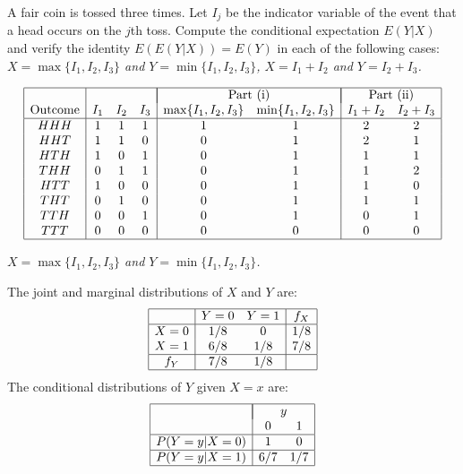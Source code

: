 \begin{exercise}
\begin{questions}
\question
A fair coin is tossed three times. Let $I_j$ be the indicator variable of the event that a head occurs on the $j$th toss. Compute the conditional expectation $E(Y|X)$ and verify the identity $E(E(Y|X)) = E(Y)$ in each of the following cases:
\ben
\it $X =\max\{I_1, I_2, I_3\}$ and $Y = \min\{I_1, I_2, I_3\}$,
\it $X = I_1 + I_2$ and $Y = I_2 + I_3$.
\een

\begin{answer}
\[
\begin{array}{|c|ccc|cc|cc|}\hline
 & & & & \multicolumn{2}{|c|}{\text{Part (i)}} & \multicolumn{2}{|c|}{\text{Part (ii)}} \\
\text{Outcome}	& I_1 & I_2 & I_3 & \max\{I_1,I_2,I_3\} & \min\{I_1,I_2,I_3\} & I_1+I_2 & I_2+I_3 \\ \hline
HHH	& 1 & 1 & 1 	& 1 & 1 	& 2 & 2 \\
HHT	& 1 & 1 & 0 	& 0 & 1 	& 2 & 1 \\
HTH	& 1 & 0 & 1 	& 0 & 1 	& 1 & 1 \\
THH	& 0 & 1 & 1 	& 0 & 1 	& 1 & 2 \\
HTT	& 1 & 0 & 0 	& 0 & 1 	& 1 & 0 \\
THT	& 0 & 1 & 0 	& 0 & 1 	& 1 & 1 \\
TTH	& 0 & 0 & 1 	& 0 & 1 	& 0 & 1 \\
TTT	& 0 & 0 & 0 	& 0 & 0 	& 0 & 0 \\ \hline

\end{array}
\]

\ben
\it %
$X =\max\{I_1, I_2, I_3\}$ and $Y = \min\{I_1, I_2, I_3\}$.

The joint and marginal distributions of $X$ and $Y$ are:
\[
\begin{array}{|c|cc|c|}\hline
	&	Y=0		& Y=1 	& f_X	\\ \hline
X=0	&	1/8		&	0	& 1/8 	\\
X=1	&	6/8		& 1/8	& 7/8 	\\ \hline
f_Y	&	7/8		& 1/8	& 	 	\\ \hline
\end{array}
\]
The conditional distributions of $Y$ given $X=x$ are:
\[
\begin{array}{|c|cc|}\hline
			&\multicolumn{2}{|c|}{y} \\
			&	0		& 1 		\\ \hline
P(Y=y|X=0)	&	1		& 0 		\\ \hline
P(Y=y|X=1)	&	6/7		& 1/7 	\\ \hline
\end{array}
\]


\end{answer}
\end{questions}
\end{exercise}
